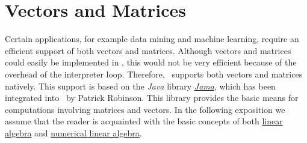 \chapter{Vectors and Matrices \label{chapter:linear-algebra.tex}}
Certain applications, for example data mining and machine learning, require an efficient support of both
vectors and matrices. 
Although vectors and matrices could easily be implemented in \setlx, this would not be very
efficient because of the overhead of the interpreter loop.  Therefore, \setlx\ supports both vectors and
matrices natively.  This support is based on the \textsl{Java} library 
\href{http://math.nist.gov/javanumerics/jama/}{\textsl{Jama}}, which has been integrated into
\setlx\ by Patrick Robinson.  This library provides the basic means for computations involving
matrices and vectors.  In the following exposition we assume that the reader is acquainted with the
basic concepts of both 
\href{http://en.wikipedia.org/wiki/Linear_algebra}{linear algebra} and
\href{http://en.wikipedia.org/wiki/Numerical_linear_algebra}{numerical linear algebra}.

